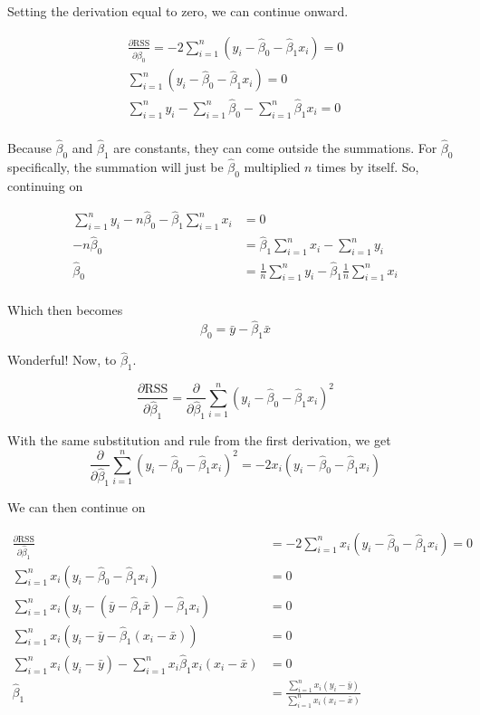 \documentclass[12pt]{article}
\begin{document}
Setting the derivation equal to zero, we can continue onward.

\begin{align}
    \frac{\partial \text{RSS}}{\partial \hat{\beta}_0} = -2 \sum_{i=1}^n (y_i - \hat{\beta}_0 - \hat{\beta}_1 x_i) = 0\\
    \sum_{i=1}^n (y_i - \hat{\beta}_0 - \hat{\beta}_1 x_i) = 0 \\
    \sum_{i=1}^n y_i - \sum_{i=1}^n \hat{\beta}_0 - \sum_{i=1}^n \hat{\beta}_1 x_i = 0\\ 
\end{align}

Because $\hat{\beta}_0$ and $\hat{\beta}_1$ are constants, they can come outside the summations. 
For $\hat{\beta}_0$ specifically, the summation will just be $\hat{\beta}_0$ multiplied $n$ times by itself. So, continuing on

\begin{align}
    \sum_{i=1}^n y_i - n \hat{\beta}_0 - \hat{\beta}_1 \sum_{i=1}^n  x_i &= 0\\
    -n \hat{\beta}_0 &= \hat{\beta}_1 \sum_{i=1}^n  x_i - \sum_{i=1}^n y_i\\
    \hat{\beta}_0 &= \frac{1}{n} \sum_{i=1}^n y_i - \hat{\beta}_1 \frac{1}{n} \sum_{i=1}^n  x_i\\ 
\end{align}

Which then becomes
\begin{equation}
    \boxed{\hat{\beta}_0 = \bar{y} - \hat{\beta}_1 \bar{x}}
\end{equation}

Wonderful! Now, to $\hat{\beta}_1$.

\begin{equation}
    \frac{\partial \text{RSS}}{\partial \hat{\beta}_1} = \frac{\partial}{\partial \hat{\beta}_1} \sum_{i=1}^n (y_i - \hat{\beta}_0 - \hat{\beta}_1 x_i)^2
\end{equation}

With the same substitution and rule from the first derivation, we get
\begin{equation}
    \frac{\partial}{\partial \hat{\beta}_1} \sum_{i=1}^n (y_i - \hat{\beta}_0 - \hat{\beta}_1 x_i)^2 = -2x_i (y_i - \hat{\beta}_0 - \hat{\beta}_1 x_i)
\end{equation}

We can then continue on

\begin{align}
    \frac{\partial \text{RSS}}{\partial \hat{\beta}_1} &= -2 \sum_{i=1}^n x_i (y_i - \hat{\beta}_0 - \hat{\beta}_1 x_i) = 0 \\
    \sum_{i=1}^n x_i (y_i - \hat{\beta}_0 - \hat{\beta}_1 x_i) &= 0 \\
    \sum_{i=1}^n x_i (y_i - (\bar{y} - \hat{\beta}_1 \bar{x}) - \hat{\beta}_1 x_i) &= 0 \\
    \sum_{i=1}^n x_i (y_i - \bar{y} - \hat{\beta}_1 (x_i - \bar{x})) &= 0 \\
    \sum_{i=1}^n x_i (y_i - \bar{y}) - \sum_{i=1}^n x_i \hat{\beta}_1 x_i (x_i - \bar{x}) &= 0 \\
    \hat{\beta}_1 &= \frac{\sum_{i=1}^n x_i (y_i - \bar{y})}{\sum_{i=1}^n x_i (x_i - \bar{x})} \\
\end{align}
\end{document}
